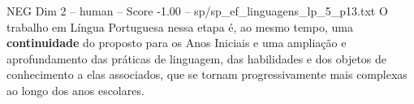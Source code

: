 \begin{textsample}{NEG Dim 2 – human – Score -1.00 – sp/sp\_ef\_linguagens\_lp\_5\_p13.txt}  \label{ex:f2_neg_020}
O trabalho em Língua Portuguesa nessa etapa é, ao mesmo tempo, uma \textbf{continuidade} do proposto para os Anos Iniciais e uma ampliação e aprofundamento das práticas de linguagem, das habilidades e dos objetos de conhecimento a elas associados, que se tornam progressivamente mais complexas ao longo dos anos escolares.

\end{textsample}

